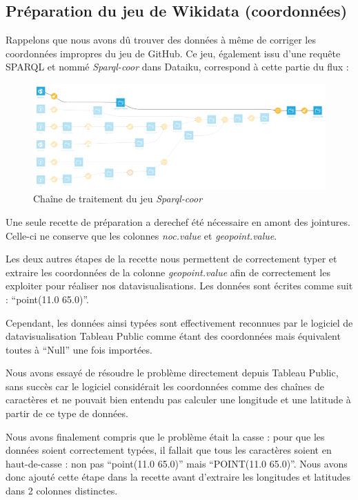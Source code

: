 \documentclass[hidelinks, 12pt]{report}
\begin{document}
\subsection{Préparation du jeu de Wikidata (coordonnées)}

Rappelons que nous avons dû trouver des données à même de corriger les coordonnées impropres du jeu de GitHub. Ce jeu, également issu d'une requête SPARQL et nommé \textit{Sparql-coor} dans Dataiku, correspond à cette partie du flux :

\begin{center}
	\begin{figure}[H]
		\setlength{\belowcaptionskip}{-35pt}
		\includegraphics[scale=0.35]{images/flow-medals-sparql-coor.png}
		\caption{Chaîne de traitement du jeu \textit{Sparql-coor}}
	\end{figure}
\end{center}

Une seule recette de préparation a derechef été nécessaire en amont des jointures. Celle-ci ne conserve que les colonnes \textit{noc.value} et \textit{geopoint.value}.

Les deux autres étapes de la recette nous permettent de correctement typer et extraire les coordonnées de la colonne \textit{geopoint.value} afin de correctement les exploiter pour réaliser nos datavisualisations. \label{casse}Les données sont écrites comme suit : \enquote{point(11.0 65.0)}.

Cependant, les données ainsi typées sont effectivement reconnues par le logiciel de datavisualisation Tableau Public comme étant des coordonnées mais équivalent toutes à \enquote{Null} une fois importées.

Nous avons essayé de résoudre le problème directement depuis Tableau Public, sans succès car le logiciel considérait les coordonnées comme des chaînes de caractères et ne pouvait bien entendu pas calculer une longitude et une latitude à partir de ce type de données.

Nous avons finalement compris que le problème était la casse : pour que les données soient correctement typées, il fallait que tous les caractères soient en haut-de-casse : non pas \enquote{point(11.0 65.0)} mais \enquote{POINT(11.0 65.0)}. Nous avons donc ajouté cette étape dans la recette avant d'extraire les longitudes et latitudes dans 2 colonnes distinctes.
\end{document}
